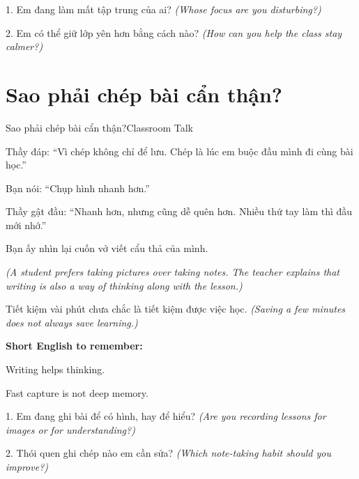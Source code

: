 \begin{tuhocnhanh}
1. Em đang làm mất tập trung của ai? \textit{(Whose focus are you disturbing?)}

2. Em có thể giữ lớp yên hơn bằng cách nào? \textit{(How can you help the class stay calmer?)}
\end{tuhocnhanh}
\ngancach

\section{Sao phải chép bài cẩn thận?}
\begin{truyen}{Sao phải chép bài cẩn thận?}{Classroom Talk}

Thầy đáp: ``Vì chép không chỉ để lưu. Chép là lúc em buộc đầu mình đi cùng bài học.''

Bạn nói: ``Chụp hình nhanh hơn.''

Thầy gật đầu: ``Nhanh hơn, nhưng cũng dễ quên hơn. Nhiều thứ tay làm thì đầu mới nhớ.''

Bạn ấy nhìn lại cuốn vở viết cẩu thả của mình.

\textit{(A student prefers taking pictures over taking notes. The teacher explains that writing is also a way of thinking along with the lesson.)}
\end{truyen}

\begin{baihoc}
Tiết kiệm vài phút chưa chắc là tiết kiệm được việc học.
\textit{(Saving a few minutes does not always save learning.)}
\end{baihoc}

\begin{ghinhoanh}
\textbf{Short English to remember:}

Writing helps thinking.

Fast capture is not deep memory.
\end{ghinhoanh}

\begin{tuhocnhanh}
1. Em đang ghi bài để có hình, hay để hiểu? \textit{(Are you recording lessons for images or for understanding?)}

2. Thói quen ghi chép nào em cần sửa? \textit{(Which note-taking habit should you improve?)}
\end{tuhocnhanh}
\ngancach

